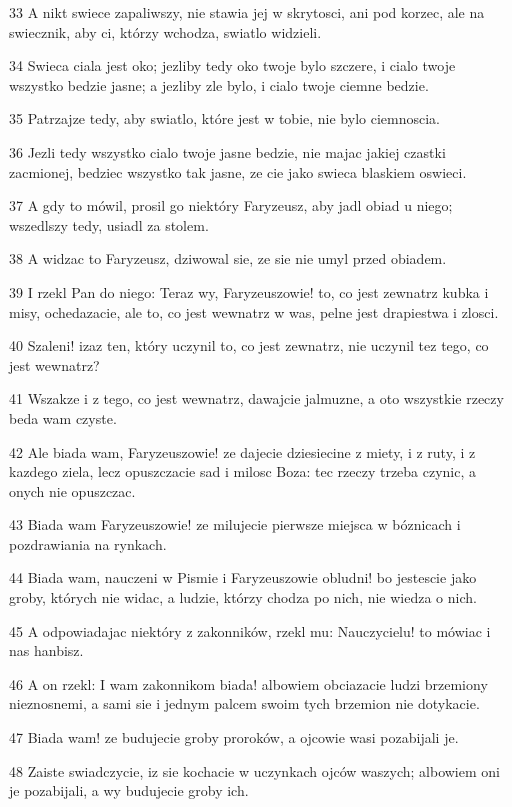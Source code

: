 \par 33 A nikt swiece zapaliwszy, nie stawia jej w skrytosci, ani pod korzec, ale na swiecznik, aby ci, którzy wchodza, swiatlo widzieli.
\par 34 Swieca ciala jest oko; jezliby tedy oko twoje bylo szczere, i cialo twoje wszystko bedzie jasne; a jezliby zle bylo, i cialo twoje ciemne bedzie.
\par 35 Patrzajze tedy, aby swiatlo, które jest w tobie, nie bylo ciemnoscia.
\par 36 Jezli tedy wszystko cialo twoje jasne bedzie, nie majac jakiej czastki zacmionej, bedziec wszystko tak jasne, ze cie jako swieca blaskiem oswieci.
\par 37 A gdy to mówil, prosil go niektóry Faryzeusz, aby jadl obiad u niego; wszedlszy tedy, usiadl za stolem.
\par 38 A widzac to Faryzeusz, dziwowal sie, ze sie nie umyl przed obiadem.
\par 39 I rzekl Pan do niego: Teraz wy, Faryzeuszowie! to, co jest zewnatrz kubka i misy, ochedazacie, ale to, co jest wewnatrz w was, pelne jest drapiestwa i zlosci.
\par 40 Szaleni! izaz ten, który uczynil to, co jest zewnatrz, nie uczynil tez tego, co jest wewnatrz?
\par 41 Wszakze i z tego, co jest wewnatrz, dawajcie jalmuzne, a oto wszystkie rzeczy beda wam czyste.
\par 42 Ale biada wam, Faryzeuszowie! ze dajecie dziesiecine z miety, i z ruty, i z kazdego ziela, lecz opuszczacie sad i milosc Boza: tec rzeczy trzeba czynic, a onych nie opuszczac.
\par 43 Biada wam Faryzeuszowie! ze milujecie pierwsze miejsca w bóznicach i pozdrawiania na rynkach.
\par 44 Biada wam, nauczeni w Pismie i Faryzeuszowie obludni! bo jestescie jako groby, których nie widac, a ludzie, którzy chodza po nich, nie wiedza o nich.
\par 45 A odpowiadajac niektóry z zakonników, rzekl mu: Nauczycielu! to mówiac i nas hanbisz.
\par 46 A on rzekl: I wam zakonnikom biada! albowiem obciazacie ludzi brzemiony nieznosnemi, a sami sie i jednym palcem swoim tych brzemion nie dotykacie.
\par 47 Biada wam! ze budujecie groby proroków, a ojcowie wasi pozabijali je.
\par 48 Zaiste swiadczycie, iz sie kochacie w uczynkach ojców waszych; albowiem oni je pozabijali, a wy budujecie groby ich.
